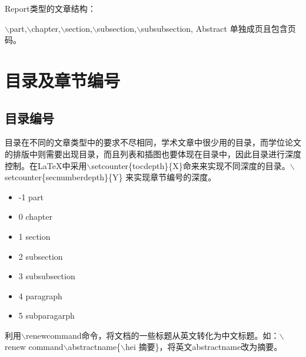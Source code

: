 \documentclass[12pt]{book}
\begin{document}
Report类型的文章结构：

$\backslash$part,$\backslash$chapter,$\backslash$section,$\backslash$subsection,$\backslash$subsubsection, Abstract 单独成页且包含页码。

\section{目录及章节编号}
    
\subsection{目录编号}
    
目录在不同的文章类型中的要求不尽相同，学术文章中很少用的目录，而学位论文的排版中则需要出现目录，而且列表和插图也要体现在目录中，因此目录进行深度控制。在\LaTeX{}中采用$\backslash$setcounter\{tocdepth\}\{X\}命来来实现不同深度的目录。$\backslash$setcounter\{secnumberdepth\}\{Y\} 来实现章节编号的深度。
    
    \begin{center}
        \begin{itemize}
            \item -1 part                    
            \item  0 chapter               
            \item  1 section                
            \item  2 subsection          
            \item  3 subsubsection     
            \item  4 paragraph            
            \item  5 subparagarph   
        \end{itemize}
    \end{center}
    
    
利用$\backslash$renewcommand命令，将文档的一些标题从英文转化为中文标题。如：$\backslash$renew command$\backslash$abstractname\{$\backslash$hei 摘要\}，将英文abstractname改为摘要。
    
%
\end{document}

